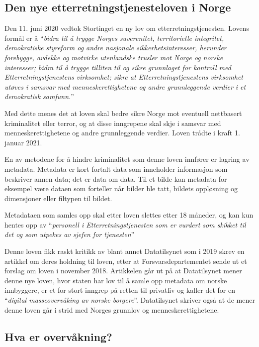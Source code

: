 \subsection{Den nye etterretningstjenesteloven i Norge}
Den 11. juni 2020 vedtok Stortinget en ny lov om etterretningstjenesten. \parencite{artikkel:regjeringen_nylov}
Lovens formål er å ``\textit{bidra til å trygge Norges suverenitet, territorielle integritet, demokratiske styreform og andre nasjonale sikkerhetsinteresser, herunder forebygge, avdekke og motvirke utenlandske trusler mot Norge og norske interesser; bidra til å trygge tilliten til og sikre grunnlaget for kontroll med Etterretningstjenestens virksomhet; sikre at Etterretningstjenestens virksomhet utøves i samsvar med menneskerettighetene og andre grunnleggende verdier i et demokratisk samfunn.}'' \parencite[§1-1]{artikkel:lovdata_etterretningstjenesten} 
\newpage

Med dette menes det at loven skal bedre sikre Norge mot eventuell nettbasert kriminalitet eller terror, og at disse inngrepene skal skje i samsvar med menneskerettighetene og andre grunnleggende verdier. Loven trådte i kraft 1. januar 2021.

En av metodene for å hindre kriminalitet som denne loven innfører er lagring av metadata. \parencite[§7-7]{artikkel:lovdata_etterretningstjenesten} Metadata er kort fortalt data som inneholder informasjon som beskriver annen data; det er data om data. Til et bilde kan metadata for eksempel være dataen som forteller når bilder ble tatt, bildets oppløsning og dimensjoner eller filtypen til bildet. 

Metadataen som samles opp skal etter loven slettes etter 18 måneder, og kan kun hentes opp av ``\textit{personell i Etterretningstjenesten som er vurdert som skikket til det og som utpekes av sjefen for tjenesten}'' \parencite[§7-8]{artikkel:lovdata_etterretningstjenesten}

Denne loven fikk raskt kritikk av blant annet Datatilsynet som i 2019 skrev en artikkel om deres holdning til loven, etter at Forsvarsdepartementet sende ut et forslag om loven i november 2018. Artikkelen går ut på at Datatilsynet mener denne nye loven, hvor staten har lov til å samle opp metadata om norske innbyggere, er et for stort inngrep på retten til privatliv og kaller det for en ``\textit{digital masseovervåking av norske borgere}''. Datatilsynet skriver også at de mener denne loven går i strid med Norges grunnlov og menneskerettighetene. \parencite{artikkel:datatilsynet_etterretningstjenesten}

\subsection{Hva er overvåkning?}

\newpage
